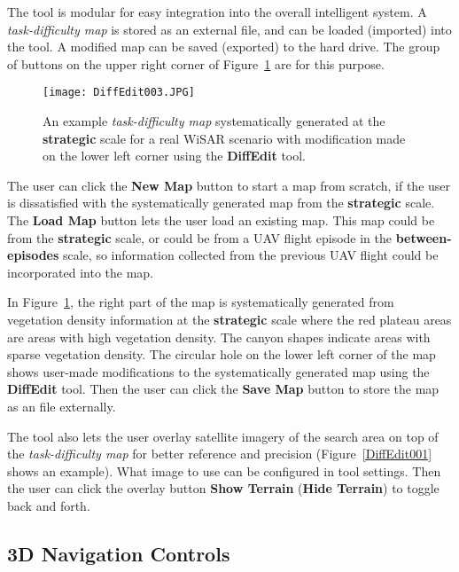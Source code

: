 The tool is modular for easy integration into the overall intelligent system. A \textit{task-difficulty map} is stored as an external file, and can be loaded (imported) into the tool. A modified map can be saved (exported) to the hard drive. The group of buttons on the upper right corner of Figure~\ref{DiffEdit003} are for this purpose.

\begin{figure}
\centering
\texttt{[image: DiffEdit003.JPG]}
\caption[Task-difficulty map generated with DiffCreate (real WiSAR scenario)]{An example \textit{task-difficulty map} systematically generated at the \textbf{strategic} scale for a real WiSAR scenario with modification made on the lower left corner using the \textbf{DiffEdit} tool.}
\label{DiffEdit003}
\end{figure}

The user can click the \textbf{New Map} button to start a map from scratch, if the user is dissatisfied with the systematically generated map from the \textbf{strategic} scale. The \textbf{Load Map} button lets the user load an existing map. This map could be from the \textbf{strategic} scale, or could be from a UAV flight episode in the \textbf{between-episodes} scale, so information collected from the previous UAV flight could be incorporated into the map. 

In Figure~\ref{DiffEdit003}, the right part of the map is systematically generated from vegetation density information at the \textbf{strategic} scale where the red plateau areas are areas with high vegetation density. The canyon shapes indicate areas with sparse vegetation density. The circular hole on the lower left corner of the map shows user-made modifications to the systematically generated map using the \textbf{DiffEdit} tool. Then the user can click the \textbf{Save Map} button to store the map as an file externally.

The tool also lets the user overlay satellite imagery of the search area on top of the \textit{task-difficulty map} for better reference and precision (Figure~\ref{DiffEdit001} shows an example). What image to use can be configured in tool settings. Then the user can click the overlay button \textbf{Show Terrain} (\textbf{Hide Terrain}) to toggle back and forth.

\subsection{3D Navigation Controls}


